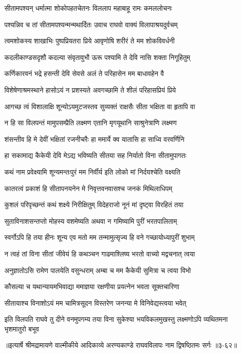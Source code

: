 
\twolineshloka
{सीतामपश्यन् धर्मात्मा शोकोपहतचेतनः}
{विललाप महाबाहू रामः कमललोचनः} %

\twolineshloka
{पश्यन्निव च तां सीतामपश्यन्मन्मथार्दितः}
{उवाच राघवो वाक्यं विलापाश्रयदुर्वचम्} %

\twolineshloka
{त्वमशोकस्य शाखाभिः पुष्पप्रियतरा प्रिये}
{आवृणोषि शरीरं ते मम शोकविवर्धनी} %

\twolineshloka
{कदलीकाण्डसदृशौ कदल्या संवृतावुभौ}
{ऊरू पश्यामि ते देवि नासि शक्ता निगूहितुम्} %

\twolineshloka
{कर्णिकारवनं भद्रे हसन्ती देवि सेवसे}
{अलं ते परिहासेन मम बाधावहेन वै} %

\twolineshloka
{विशेषेणाश्रमस्थाने हासोऽयं न प्रशस्यते}
{अवगच्छामि ते शीलं परिहासप्रियं प्रिये} %

\twolineshloka
{आगच्छ त्वं विशालाक्षि शून्योऽयमुटजस्तव}
{सुव्यक्तं राक्षसैः सीता भक्षिता वा हृतापि वा} %

\twolineshloka
{न हि सा विलपन्तं मामुपसम्प्रैति लक्ष्मण}
{एतानि मृगयूथानि साश्रुनेत्राणि लक्ष्मण} %

\twolineshloka
{शंसन्तीव हि मे देवीं भक्षितां रजनीचरैः}
{हा ममार्ये क्व यातासि हा साध्वि वरवर्णिनि} %

\twolineshloka
{हा सकामाद्य कैकेयी देवि मेऽद्य भविष्यति}
{सीतया सह निर्यातो विना सीतामुपागतः} %

\twolineshloka
{कथं नाम प्रवेक्ष्यामि शून्यमन्तःपुरं मम}
{निर्वीर्य इति लोको मां निर्दयश्चेति वक्ष्यति} %

\twolineshloka
{कातरत्वं प्रकाशं हि सीतापनयनेन मे}
{निवृत्तवनवासश्च जनकं मिथिलाधिपम्} %

\twolineshloka
{कुशलं परिपृच्छन्तं कथं शक्ष्ये निरीक्षितुम्}
{विदेहराजो नूनं मां दृष्ट्वा विरहितं तया} %

\twolineshloka
{सुताविनाशसन्तप्तो मोहस्य वशमेष्यति}
{अथवा न गमिष्यामि पुरीं भरतपालिताम्} %

\twolineshloka
{स्वर्गोऽपि हि तया हीनः शून्य एव मतो मम}
{तन्मामुत्सृज्य हि वने गच्छायोध्यापुरीं शुभाम्} %

\twolineshloka
{न त्वहं तां विना सीतां जीवेयं हि कथञ्चन}
{गाढमाश्लिष्य भरतो वाच्यो मद्वचनात् त्वया} %

\twolineshloka
{अनुज्ञातोऽसि रामेण पालयेति वसुन्धराम्}
{अम्बा च मम कैकेयी सुमित्रा च त्वया विभो} %

\twolineshloka
{कौसल्या च यथान्यायमभिवाद्या ममाज्ञया}
{रक्षणीया प्रयत्नेन भवता सूक्तचारिणा} %

\twolineshloka
{सीतायाश्च विनाशोऽयं मम चामित्रसूदन}
{विस्तरेण जनन्या मे विनिवेद्यस्त्वया भवेत्} %

\twolineshloka
{इति विलपति राघवे तु दीने वनमुपगम्य तया विना सुकेश्या}
{भयविकलमुखस्तु लक्ष्मणोऽपि व्यथितमना भृशमातुरो बभूव} %


॥इत्यार्षे श्रीमद्रामायणे वाल्मीकीये आदिकाव्ये अरण्यकाण्डे राघवविलापः नाम द्विषष्ठितमः सर्गः ॥३-६२॥
